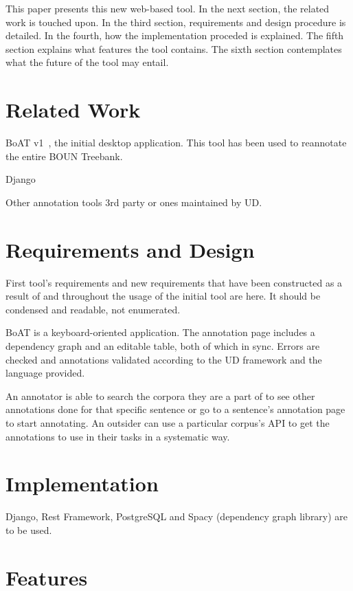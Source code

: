 \documentclass[
]{ceurart}
\begin{document}
This paper presents this new web-based tool.
In the next section, the related work is touched upon.
In the third section, requirements and design procedure is detailed.
In the fourth, how the implementation proceded is explained.
The fifth section explains what features the tool contains.
The sixth section contemplates what the future of the tool may entail.

\section{Related Work}

BoAT v1~\cite{turk-etal-2019-turkish}, the initial desktop application. This tool has been used to reannotate the entire BOUN Treebank.

Django\cite{django}

Other annotation tools 3rd party or ones maintained by UD.

\section{Requirements and Design}

First tool's requirements and new requirements that have been constructed as a result of and throughout the usage of the initial tool are here.
It should be condensed and readable, not enumerated.

BoAT is a keyboard-oriented application.
The annotation page includes a dependency graph and an editable table, both of which in sync.
Errors are checked and annotations validated according to the UD framework and the language provided.

An annotator is able to search the corpora they are a part of to see other annotations done for that specific sentence or go to a sentence's annotation page to start annotating.
An outsider can use a particular corpus's API to get the annotations to use in their tasks in a systematic way.

\section{Implementation}

Django, Rest Framework, PostgreSQL and Spacy (dependency graph library) are to be used.

\section{Features}
\end{document}
